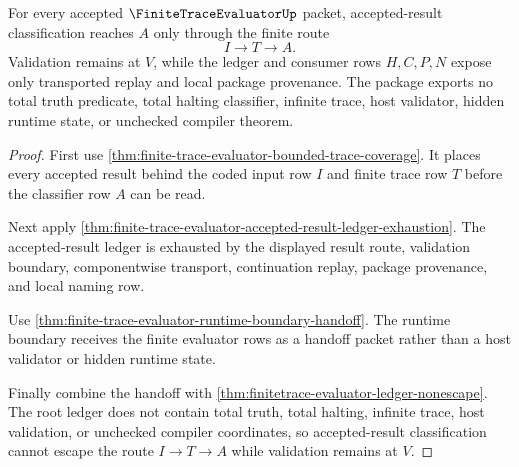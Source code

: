 \begin{theorem}
\label{thm:finite-trace-evaluator-result-factorization-nonescape}
For every accepted $\FiniteTraceEvaluatorUp$ packet, accepted-result
classification reaches $A$ only through the finite route
$$
I \to T \to A.
$$
Validation remains at $V$, while the ledger and consumer rows $H,C,P,N$ expose
only transported replay and local package provenance. The package exports no
total truth predicate, total halting classifier, infinite trace, host
validator, hidden runtime state, or unchecked compiler theorem.
\end{theorem}
\begin{proof}
First use \autoref{thm:finite-trace-evaluator-bounded-trace-coverage}. It
places every accepted result behind the coded input row $I$ and finite trace
row $T$ before the classifier row $A$ can be read.

Next apply \autoref{thm:finite-trace-evaluator-accepted-result-ledger-exhaustion}.
The accepted-result ledger is exhausted by the displayed result route,
validation boundary, componentwise transport, continuation replay, package
provenance, and local naming row.

Use \autoref{thm:finite-trace-evaluator-runtime-boundary-handoff}. The runtime
boundary receives the finite evaluator rows as a handoff packet rather than a
host validator or hidden runtime state.

Finally combine the handoff with
\autoref{thm:finitetrace-evaluator-ledger-nonescape}. The root ledger
does not contain total truth, total halting, infinite trace, host validation,
or unchecked compiler coordinates, so accepted-result classification cannot
escape the route $I \to T \to A$ while validation remains at $V$.
\end{proof}
